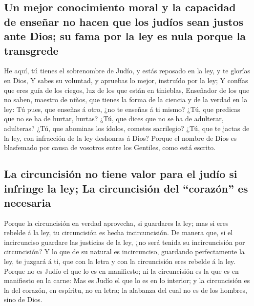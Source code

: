 \hypertarget{un-mejor-conocimiento-moral-y-la-capacidad-de-enseuxf1ar-no-hacen-que-los-juduxedos-sean-justos-ante-dios-su-fama-por-la-ley-es-nula-porque-la-transgrede}{%
\subsection{Un mejor conocimiento moral y la capacidad de enseñar no
hacen que los judíos sean justos ante Dios; su fama por la ley es nula
porque la
transgrede}\label{un-mejor-conocimiento-moral-y-la-capacidad-de-enseuxf1ar-no-hacen-que-los-juduxedos-sean-justos-ante-dios-su-fama-por-la-ley-es-nula-porque-la-transgrede}}

 He aquí, tú tienes el sobrenombre de Judío, y estás
reposado en la ley, y te glorías en Dios,  Y sabes su
voluntad, y apruebas lo mejor, instruído por la ley;  Y
confías que eres guía de los ciegos, luz de los que están en tinieblas,
 Enseñador de los que no saben, maestro de niños, que
tienes la forma de la ciencia y de la verdad en la ley:  Tú
pues, que enseñas á otro, ¿no te enseñas á ti mismo? ¿Tú, que predicas
que no se ha de hurtar, hurtas?  ¿Tú, que dices que no se
ha de adulterar, adulteras? ¿Tú, que abominas los ídolos, cometes
sacrilegio?  ¿Tú, que te jactas de la ley, con infracción
de la ley deshonras á Dios?  Porque el nombre de Dios es
blasfemado por causa de vosotros entre los Gentiles, como está escrito.

\hypertarget{la-circuncisiuxf3n-no-tiene-valor-para-el-juduxedo-si-infringe-la-ley-la-circuncisiuxf3n-del-corazuxf3n-es-necesaria}{%
\subsection{La circuncisión no tiene valor para el judío si infringe la
ley; La circuncisión del ``corazón'' es
necesaria}\label{la-circuncisiuxf3n-no-tiene-valor-para-el-juduxedo-si-infringe-la-ley-la-circuncisiuxf3n-del-corazuxf3n-es-necesaria}}

 Porque la circuncisión en verdad aprovecha, si guardares
la ley; mas si eres rebelde á la ley, tu circuncisión es hecha
incircuncisión.  De manera que, si el incircunciso guardare
las justicias de la ley, ¿no será tenida su incircuncisión por
circuncisión?  Y lo que de su natural es incircunciso,
guardando perfectamente la ley, te juzgará á ti, que con la letra y con
la circuncisión eres rebelde á la ley.  Porque no es Judío
el que lo es en manifiesto; ni la circuncisión es la que es en
manifiesto en la carne:  Mas es Judío el que lo es en lo
interior; y la circuncisión es la del corazón, en espíritu, no en letra;
la alabanza del cual no es de los hombres, sino de Dios.

